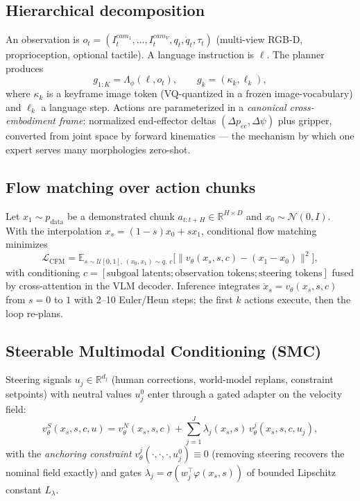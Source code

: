 \documentclass[conference,10pt]{IEEEtran}
\begin{document}
\subsection{Hierarchical decomposition}
\label{sec:decomp}
An observation is $o_t = (I_t^{cam_1},\dots,I_t^{cam_V}, q_t, \dot q_t, \tau_t)$ (multi-view RGB-D, proprioception, optional tactile). A language instruction is $\ell$. The planner produces
\begin{equation}
g_{1:K} = \Lambda_\phi(\ell, o_t), \qquad g_k = (\kappa_k, \ell_k),
\label{eq:subgoals}
\end{equation}
where $\kappa_k$ is a keyframe image token (VQ-quantized in a frozen image-vocabulary) and $\ell_k$ a language step. Actions are parameterized in a \emph{canonical cross-embodiment frame}: normalized end-effector deltas $(\Delta p_{ee}, \Delta\psi)$ plus gripper, converted from joint space by forward kinematics --- the mechanism by which one expert serves many morphologies zero-shot.

\subsection{Flow matching over action chunks}
\label{sec:flow}
Let $x_1 \sim p_{\text{data}}$ be a demonstrated chunk $a_{t:t+H} \in \mathbb{R}^{H \times D}$ and $x_0 \sim \mathcal{N}(0,I)$. With the interpolation $x_s = (1-s)x_0 + s x_1$, conditional flow matching minimizes
\begin{equation}
\mathcal{L}_{\mathrm{CFM}} = \mathbb{E}_{s \sim \mathcal{U}[0,1],\,(x_0,x_1) \sim q,\, c}
\Big[ \big\| v_\theta(x_s, s, c) - (x_1 - x_0) \big\|^2 \Big],
\label{eq:cfm}
\end{equation}
with conditioning $c = [\text{subgoal latents}; \text{observation tokens}; \text{steering tokens}]$ fused by cross-attention in the VLM decoder. Inference integrates $\dot x_s = v_\theta(x_s, s, c)$ from $s=0$ to $1$ with 2--10 Euler/Heun steps; the first $k$ actions execute, then the loop re-plans.

\subsection{Steerable Multimodal Conditioning (SMC)}
\label{sec:smc}
Steering signals $u_j \in \mathbb{R}^{d_j}$ (human corrections, world-model replans, constraint setpoints) with neutral values $u_j^0$ enter through a gated adapter on the velocity field:
\begin{equation}
v_\theta^{S}(x_s, s, c, u) = v_\theta^{N}(x_s, s, c)
+ \sum_{j=1}^{J} \lambda_j(x_s, s)\, v_\theta^{j}(x_s, s, c, u_j),
\label{eq:smc}
\end{equation}
with the \emph{anchoring constraint} $v_\theta^{j}(\cdot,\cdot,\cdot,u_j^0) \equiv 0$ (removing steering recovers the nominal field exactly) and gates $\lambda_j = \sigma(w_j^\top \varphi(x_s,s))$ of bounded Lipschitz constant $L_\lambda$.
\end{document}
